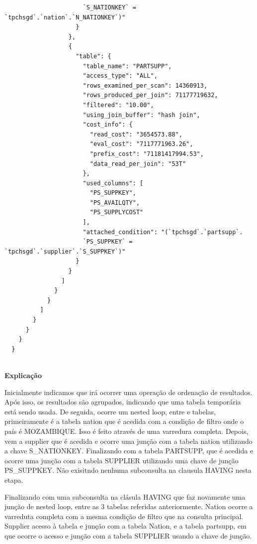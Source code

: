 \documentclass{article}
\begin{document}
\begin{lstlisting}
                      `S_NATIONKEY` = `tpchsgd`.`nation`.`N_NATIONKEY`)"
                    }
                  },
                  {
                    "table": {
                      "table_name": "PARTSUPP",
                      "access_type": "ALL",
                      "rows_examined_per_scan": 14360913,
                      "rows_produced_per_join": 71177719632,
                      "filtered": "10.00",
                      "using_join_buffer": "hash join",
                      "cost_info": {
                        "read_cost": "3654573.88",
                        "eval_cost": "7117771963.26",
                        "prefix_cost": "71181417994.53",
                        "data_read_per_join": "53T"
                      },
                      "used_columns": [
                        "PS_SUPPKEY",
                        "PS_AVAILQTY",
                        "PS_SUPPLYCOST"
                      ],
                      "attached_condition": "(`tpchsgd`.`partsupp`.
                      `PS_SUPPKEY` = `tpchsgd`.`supplier`.`S_SUPPKEY`)"
                    }
                  }
                ]
              }
            }
          ]
        }
      }
    }
  }
  
\end{lstlisting}

\textbf{Explicação}\\
\texttt{}\par Inicialmente indicamos que irá ocorrer uma operação de ordenação de resultados.
Após isso, os resultados são agrupados, indicando que uma tabela temporária está sendo usada.
De seguida, ocorre um nested loop, entre e tabelas, primeiramente é a tabela nation que é acedida com a condição de filtro onde o país é MOZAMBIQUE. Isso é feito através de uma varredura completa. Depois, vem a supplier que é acedida e ocorre uma junção com a tabela nation utilizando a chave S\_NATIONKEY. Finalizando com a tabela PARTSUPP, que é acedida e ocorre uma junção com a tabela SUPPLIER utilizando uma chave de junção PS\_SUPPKEY. Não exisitndo nenhuma subconsulta na clausula HAVING nesta etapa.

Finalizando com uma subconsulta na clásula HAVING que faz novamente uma junção de nested loop, entre as 3 tabelas referidas anteriormente. Nation ocorre a varreduta completa com a mesma condição de filtro que na consulta principal. Supplier acesso à tabela e junção com a tabela Nation, e a tabela partsupp, em que ocorre o acesso e junção com a tabela SUPPLIER usando a chave de junção.
\end{document}
